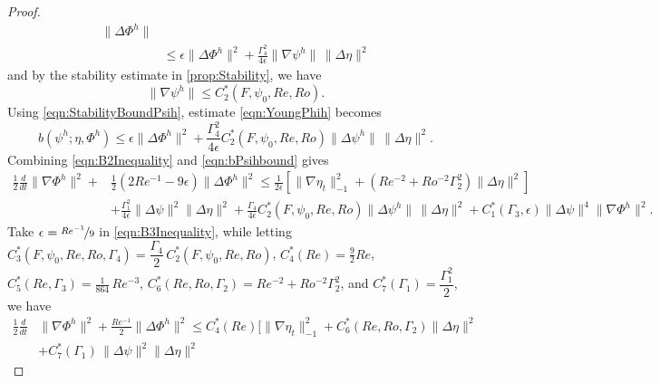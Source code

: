 \begin{proof}
\begin{align}
      \|\Delta \Phi^h\| \nonumber \\
    &\le \epsilon \|\Delta \Phi^h\|^2 + \frac{\Gamma_4^2}{4\epsilon}
      \|\nabla \psi^h\|\, \|\Delta \eta\|^2 \label{eqn:YoungPhih}
  \end{align}
  and by the stability estimate in \autoref{prop:Stability}, we have
  \begin{equation}
    \|\nabla \psi^h\| \le C^*_2(F,\psi_0, Re, Ro).
    \label{eqn:StabilityBoundPsih}
  \end{equation}
  Using \eqref{eqn:StabilityBoundPsih}, estimate \eqref{eqn:YoungPhih} becomes
  \begin{equation}
    b(\psi^h; \eta, \Phi^h) \le \epsilon \|\Delta \Phi^h\|^2 +
      \frac{\Gamma_4^2}{4\epsilon} C^*_2(F,\psi_0,Re,Ro) \|\Delta \psi^h\|\,
      \|\Delta \eta\|^2.
    \label{eqn:bPsihbound}
  \end{equation}
  Combining \eqref{eqn:B2Inequality} and \eqref{eqn:bPsihbound} gives
  \begin{equation}
    \begin{split}
      \frac{1}{2} \frac{d}{dt} \|\nabla \Phi^h\|^2 + &\frac{1}{2}\left(2Re^{-1} -
        9 \epsilon \right)
        \|\Delta \Phi^h\|^2 \le \frac{1}{2 \epsilon}\left[\|\nabla \eta_t\|_{-1}^2
        + \left( Re^{-2} + Ro^{-2} \Gamma_2^2 \right) \|\Delta \eta\|^2\right] \\
      & + \frac{\Gamma_1^2}{4 \epsilon} \|\Delta \psi\|^2 \|\Delta \eta\|^2
        + \frac{\Gamma_4}{4\epsilon}C^*_2(F,\psi_0,Re,Ro) \|\Delta \psi^h\|\,
        \|\Delta \eta\|^2 + C^*_1(\Gamma_3,\epsilon) \|\Delta \psi\|^4 \|\nabla \Phi^h\|^2.
    \end{split}
    \label{eqn:B3Inequality}
  \end{equation}
  Take $\epsilon = \nicefrac{Re^{-1}}{9}$ in \eqref{eqn:B3Inequality}, while
  letting $C^*_3(F,\psi_0,Re,Ro,\Gamma_4) = \dfrac{\Gamma_4}{2}\, C^*_2(F,\psi_0,Re,Ro)$,
  $C^*_4(Re) = \frac{9}{2} Re$, $C^*_5(Re,\Gamma_3)=\frac{1}{864}\,Re^{-3}$,
  $C^*_6(Re,Ro,\Gamma_2) = Re^{-2} + Ro^{-2}\Gamma_2^2$, and $C^*_7(\Gamma_1) = \dfrac{\Gamma_1^2}{2}$,
  we have
  \begin{equation}
    \begin{split}
      \frac{1}{2} \frac{d}{dt} &\|\nabla \Phi^h\|^2
        + \frac{Re^{-1}}{2} \|\Delta \Phi^h\|^2
        \le C^*_4(Re) \biggl[\|\nabla \eta_t\|_{-1}^2
        + C^*_6(Re, Ro,\Gamma_2) \|\Delta \eta\|^2 \\
      & + C^*_7(\Gamma_1)\, \|\Delta \psi\|^2 \|\Delta \eta\|^2

\end{split}
\end{equation}
\end{proof}
